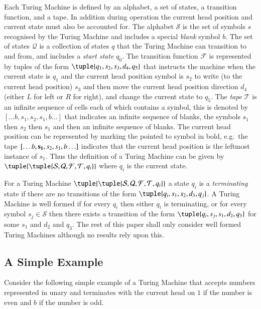 \documentclass[submission,copyright,creativecommons]{eptcs}
\newcommand{\tmach}[1]{\tuple{\tuple{#1}}}
\newcommand{\tape}[1]{[#1]}
\begin{document}
Each Turing Machine is defined by an alphabet, a set of states, a transition function,
and a tape. In addition during operation the current head position and current state
must also be accounted for.
The alphabet ${\mathcal S}$ is the set of symbols $s$ recognised by the Turing Machine and includes
a special {\em blank} symbol $b$.
The set of states ${\mathcal Q}$ is a collection of states $q$ that the Turing Machine can transition
to and from, and includes a {\em start state} $q_0$.
The transition function ${\mathcal F}$ is represented by tuples of the form
$\tuple{q_1,s_2,s_3,d_4,q_5}$ that instructs the machine when the current state is $q_1$ and the
current head position symbol is $s_2$ to write (to the current head position) $s_3$ and
then move the current head position direction $d_4$ (either $L$ for left or $R$ for right),
and change the current state to $q_5$.
The {\em tape} ${\mathcal T}$ is an infinite sequence of cells each of which contains a symbol,
this is denoted by $\tape{\ldots b,s_1,s_2,s_1,b\ldots}$ that indicates an infinite sequence
of blanks, the symbols $s_1$ then $s_2$ then $s_1$ and then an infinite sequence of blanks.
The current head position can be represented by marking the pointed to symbol in bold,
e.g.~the tape $\tape{\ldots b,{\bf s_1},s_2,s_1,b\ldots}$ indicates that the current head position is
the leftmost instance of $s_1$.
Thus the definition of a Turing Machine can be given by
$\tmach{{\mathcal S}, {\mathcal Q}, {\mathcal F}, {\mathcal T}, q_i}$ where
$q_i$ is the current state.

For a Turing Machine $\tmach{{\mathcal S}, {\mathcal Q}, {\mathcal F}, {\mathcal T}, q_i}$
a state $q_i$ is a {\em terminating} state if there are no transitions of the
form $\tuple{q_i,s_1,s_2,d_3,q_j}$.
A Turing Machine is well formed if for every $q_i$ then either $q_i$ is terminating, or
for every symbol $s_j\in{\mathcal S}$ then there exists a transition of the
form $\tuple{q_i,s_j,s_1,d_2,q_3}$ for some $s_1$ and $d_2$ and $q_3$.
The rest of this paper shall only consider well formed Turing Machines
although no results rely upon this.


\subsection*{A Simple Example}

Consider the following simple example of a Turing Machine that accepts numbers
represented in unary and terminates with the current head on $1$ if the number is
even and $b$ if the number is odd.
\end{document}
